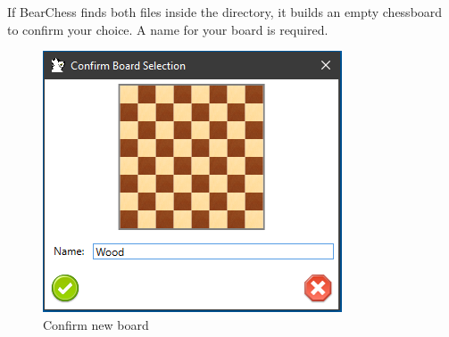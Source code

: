 \documentclass[11pt,a4paper]{article}
\begin{document}
	If BearChess finds both files inside the directory, it builds an empty chessboard to confirm your choice. A name for your board is required.
	
	\begin{figure}[H]
		\centering
		\includegraphics[scale=1.0]{ConfirmBoard.png}
		\caption{Confirm new board }
		\label{fig:ConfirmBoard}
	\end{figure}
	
\end{document}
